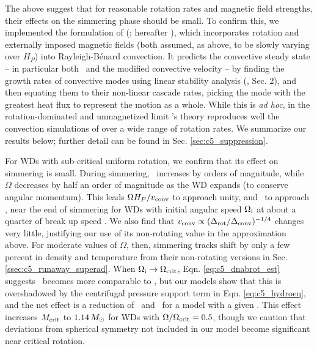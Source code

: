 The above suggest that for reasonable rotation rates and magnetic field strengths, their effects on the simmering phase should be small.  To confirm this, we implemented the formulation of \citeauthor{stev79} (\citeyear{stev79}; hereafter \citeal{stev79}), which incorporates rotation and externally imposed magnetic fields (both assumed, as above, to be slowly varying over $H_P$) into Rayleigh-B\'{e}nard convection.  It predicts the convective steady state -- in particular both \deltanab\ and the modified convective velocity -- by finding the growth rates of convective modes using linear stability analysis (\citeal{stev79}, Sec. 2), and then equating them to their non-linear cascade rates, picking the mode with the greatest heat flux to represent the motion as a whole.  While this is \textit{ad hoc}, in the rotation-dominated and unmagnetized limit \citeal{stev79}'s theory reproduces well the convection simulations of \cite{barkdl14} over a wide range of rotation rates.  We summarize our results below; further detail can be found in Sec. \ref{sec:c5_suppression}.

For WDs with sub-critical uniform rotation, we confirm that its effect on simmering is small.  During simmering, \vconv\ increases by orders of magnitude, while $\Omega$ decreases by half an order of magnitude as the WD expands (to conserve angular momentum).  This leads $\Omega H_P/\vconv$ to approach unity, and \dnabrot\ to approach \dnabconv, near the end of simmering for WDs with initial angular speed $\Ominit$ at about a quarter of break up speed \Omcrit.  We also find that $\vconv \propto (\dnabrot/\dnabconv)^{-1/4}$ changes very little, justifying our use of its non-rotating value in the approximation above. For moderate values of $\Omega$, then, simmering tracks shift by only a few percent in density and temperature from their non-rotating versions in Sec. \ref{ssec:c5_runaway_superad}.  When $\Ominit \rightarrow \Omcrit$, Eqn. \ref{eq:c5_dnabrot_est} suggests \dnabrot\ becomes more comparable to \nablaad, but our models show that this is overshadowed by the centrifugal pressure support term in Eqn. \ref{eq:c5_hydroeq}, and the net effect is a reduction of \rhoc\ and \Tc\ for a model with a given \Sc.  This effect increases $\Mcrit$ to $1.14\,\Msun$ for WDs with $\Omega/\Omcrit = 0.5$, though we caution that deviations from spherical symmetry not included in our model become significant near critical rotation.


